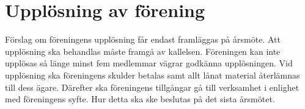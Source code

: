 \section{Upplösning av förening}
Förslag om föreningens upplösning får endast framläggas på årsmöte. Att upplösning ska behandlas måste framgå av kallelsen. Föreningen kan inte upplösas så länge minst fem medlemmar vägrar godkänna upplösningen. Vid upplösning ska föreningens skulder betalas samt allt lånat material återlämnas till dess ägare. Därefter ska föreningens tillgångar gå till verksamhet i enlighet med föreningens syfte. Hur detta ska ske beslutas på det sista årsmötet.